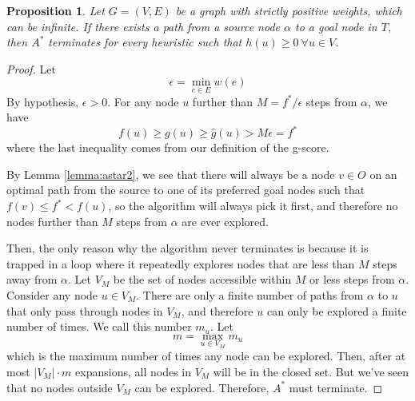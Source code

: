 \documentclass[a4paper,10pt]{report}
\newtheorem{proposition}[theorem]{Proposition}
\begin{document}
\begin{proposition}
\label{prop:astar-termination}
Let $G = (V, E)$ be a graph with strictly positive weights, which can be infinite. If there exists a path from a source node $\alpha$ to a goal node in $T$, then $A^*$ terminates for every heuristic such that $h(u) \geq 0 \  \forall u \in V$.
\end{proposition}
\begin{proof}
Let
\[ \epsilon = \min_{e \in E} w(e) \]
By hypothesis, $\epsilon > 0$. For any node $u$ further than $M = f^*/\epsilon$ steps from $\alpha$, we have
\[ f(u) \geq g(u) \geq \hat{g}(u) > M \epsilon = f^* \]
where the last inequality comes from our definition of the g-score.

By Lemma \ref{lemma:astar2}, we see that there will always be a node $v \in O$ on an optimal path from the source to one of its preferred goal nodes such that $f(v) \leq f^* < f(u)$, so the algorithm will always pick it first, and therefore no nodes further than $M$ steps from $\alpha$ are ever explored.

Then, the only reason why the algorithm never terminates is because it is trapped in a loop where it repeatedly explores nodes that are less than $M$ steps away from $\alpha$. Let $V_M$ be the set of nodes accessible within $M$ or less steps from $\alpha$. Consider any node $u \in V_M$. There are only a finite number of paths from $\alpha$ to $u$ that only pass through nodes in $V_M$, and therefore $u$ can only be explored a finite number of times. We call this number $m_u$. Let
\[ m = \max_{u \in V_M} m_u \]
which is the maximum number of times any node can be explored. Then, after at most $|V_M| \cdot m$ expansions, all nodes in $V_M$ will be in the closed set. But we've seen that no nodes outside $V_M$ can be explored. Therefore, $A^*$ must terminate.
\end{proof}
\end{document}
